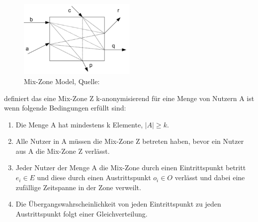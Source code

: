 \begin{figure}[!h]
		\centering
		\includegraphics[width=0.5\textwidth]{Bilder/MixZone.PNG}
		\caption{Mix-Zone Model, Quelle: \protect\cite{Palanisamy2011}}
		\label{fig_Palanisamy2011}
\end{figure}

\cite{Palanisamy2011} definiert das eine Mix-Zone Z k-anonymisierend für eine Menge von Nutzern A ist wenn folgende Bedingungen erfüllt sind:
\begin{enumerate}
\item Die Menge A hat mindestens k Elemente, $ |A| \geq k $.
\item Alle Nutzer in A müssen die Mix-Zone Z betreten haben, bevor ein Nutzer aus A die Mix-Zone Z verlässt.
\item Jeder Nutzer der Menge A die Mix-Zone durch einen Eintrittspunkt betritt $ e_{i} \in E $ und diese durch einen Austrittspunkt $ o_{i} \in O $ verlässt und dabei eine zufällige Zeitspanne in der Zone verweilt.
\item Die Übergangswahrscheinlichkeit von jeden Eintrittspunkt zu jeden Austrittspunkt folgt einer Gleichverteilung.
\end{enumerate}